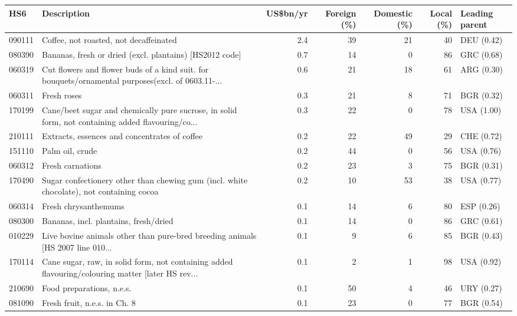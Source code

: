 \begin{tabular}{@{}l p{6.4cm} r r r r l@{}}
\toprule
HS6 & Description & US\$bn/yr & Foreign (\%) & Domestic (\%) & Local (\%) & Leading parent \\
\midrule
090111 & Coffee, not roasted, not decaffeinated & 2.4 & 39 & 21 & 40 & DEU (0.42) \\
080390 & Bananas, fresh or dried (excl. plantains) [HS2012 code] & 0.7 & 14 & 0 & 86 & GRC (0.68) \\
060319 & Cut flowers and flower buds of a kind suit. for bouquets/\allowbreak{}ornamental purposes(excl. of 0603.11-... & 0.6 & 21 & 18 & 61 & ARG (0.30) \\
060311 & Fresh roses & 0.3 & 21 & 8 & 71 & BGR (0.32) \\
170199 & Cane/\allowbreak{}beet sugar and chemically pure sucrose, in solid form, not containing added flavouring/\allowbreak{}co... & 0.3 & 22 & 0 & 78 & USA (1.00) \\
210111 & Extracts, essences and concentrates of coffee & 0.2 & 22 & 49 & 29 & CHE (0.72) \\
151110 & Palm oil, crude & 0.2 & 44 & 0 & 56 & USA (0.76) \\
060312 & Fresh carnations & 0.2 & 23 & 3 & 75 & BGR (0.31) \\
170490 & Sugar confectionery other than chewing gum (incl. white chocolate), not containing cocoa & 0.2 & 10 & 53 & 38 & USA (0.77) \\
060314 & Fresh chrysanthemums & 0.1 & 14 & 6 & 80 & ESP (0.26) \\
080300 & Bananas, incl. plantains, fresh/\allowbreak{}dried & 0.1 & 14 & 0 & 86 & GRC (0.61) \\
010229 & Live bovine animals other than pure-bred breeding animals [HS 2007 line 010... & 0.1 & 9 & 6 & 85 & BGR (0.43) \\
170114 & Cane sugar, raw, in solid form, not containing added flavouring/\allowbreak{}colouring matter [later HS rev... & 0.1 & 2 & 1 & 98 & USA (0.92) \\
210690 & Food preparations, n.e.s. & 0.1 & 50 & 4 & 46 & URY (0.27) \\
081090 & Fresh fruit, n.e.s. in Ch. 8 & 0.1 & 23 & 0 & 77 & BGR (0.54) \\
\bottomrule
\end{tabular}

